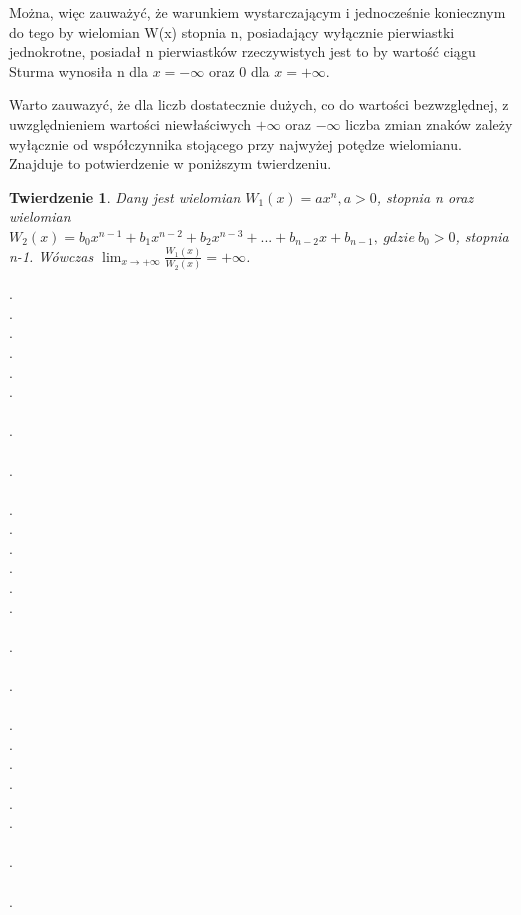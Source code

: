 \documentclass[twoside,a4paper]{book}
\newtheorem{theorem}{Twierdzenie}
\begin{document}
Można, więc zauważyć, że warunkiem wystarczającym i jednocześnie koniecznym do tego by wielomian W(x) stopnia n, posiadający wyłącznie pierwiastki jednokrotne, posiadał n pierwiastków rzeczywistych jest to by wartość ciągu Sturma wynosiła n dla $x=-\infty$ oraz 0 dla $x=+\infty$. 

Warto zauwazyć, że dla liczb dostatecznie dużych, co do wartości bezwzględnej, z uwzględnieniem wartości niewłaściwych $+\infty$ oraz $-\infty$ liczba zmian znaków zależy wyłącznie od współczynnika stojącego przy najwyżej potędze wielomianu. Znajduje to potwierdzenie w poniższym twierdzeniu.

\begin{theorem}
	Dany jest wielomian $W_1(x) = ax^n, a > 0$, stopnia n oraz wielomian $W_2(x) = b_0x^{n-1} + b_1x^{n-2} + b_2x^{n-3} + ... + b_{n-2}x  + b_{n-1},\ gdzie\ b_0 > 0$, stopnia n-1. Wówczas $\lim_{x \to +\infty}\frac{W_1(x)}{W_2(x)} = +\infty$.
\end{theorem}



.\\
.\\
.\\
.\\
.\\
.\\\\
.\\\\
.\\\\
.\\
.\\
.\\
.\\
.\\
.\\\\
.\\\\
.\\\\
.\\
.\\
.\\
.\\
.\\
.\\\\
.\\\\
.\\\\


\backmatter




\end{document}
